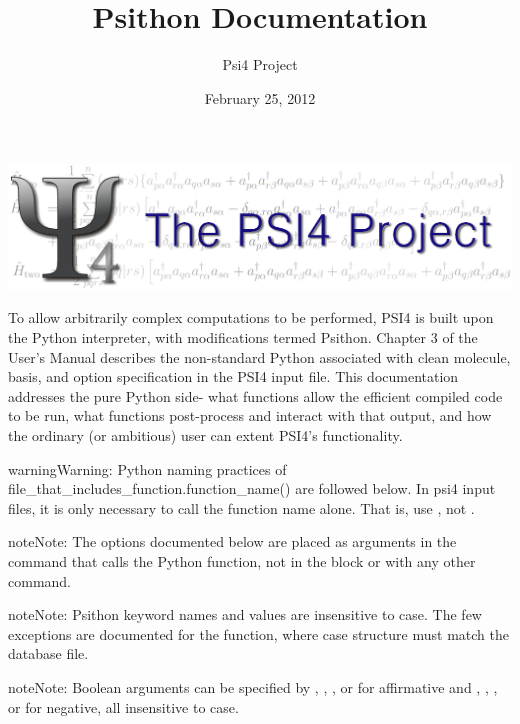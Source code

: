 \documentclass[letterpaper,10pt,english]{sphinxmanual}
\title{Psithon Documentation}
\date{February 25, 2012}
\author{Psi4 Project}
\begin{document}
\maketitle
\tableofcontents
{}\label{index::doc}
\includegraphics[width=1.000\linewidth]{PSI4_3.png}



To allow arbitrarily complex computations to be performed, PSI4 is built
upon the Python interpreter, with modifications termed Psithon. Chapter 3
of the User's Manual describes the non-standard Python associated with
clean molecule, basis, and option specification in the PSI4 input file.
This documentation addresses the pure Python side- what functions allow
the efficient compiled code to be run, what functions post-process and
interact with that output, and how the ordinary (or ambitious) user can
extent PSI4's functionality.

\begin{notice}{warning}{Warning:}
Python naming practices of file\_that\_includes\_function.function\_name()
are followed below. In psi4 input files, it is only necessary to call the
function name alone. That is, use , not .
\end{notice}

\begin{notice}{note}{Note:}
The options documented below are placed as arguments in the command that
calls the Python function, not in the  block or with any
other  command.
\end{notice}

\begin{notice}{note}{Note:}
Psithon keyword names and values are insensitive to case. The few
exceptions are documented for the  function, where case
structure must match the database file.
\end{notice}

\begin{notice}{note}{Note:}
Boolean arguments can be specified by , , , or 
for affirmative and , , , or  for negative,
all insensitive to case.
\end{notice}
\end{document}
